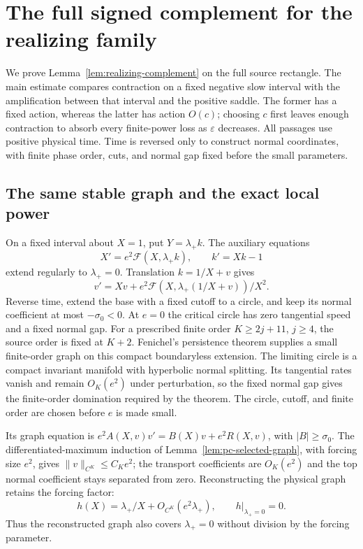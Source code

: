 \section{The full signed complement for the realizing family}
\label{sec:lower-complement}
We prove Lemma~\ref{lem:realizing-complement} on the full source
rectangle. The main estimate compares contraction on a fixed negative
slow interval with the amplification between that interval and the
positive saddle. The former has a fixed action, whereas the latter
has action $O(c)$; choosing $c$ first leaves enough contraction to
absorb every finite-power loss as $\varepsilon$ decreases. All
passages use positive physical time. Time is reversed only to
construct normal coordinates, with finite phase order, cuts, and
normal gap fixed before the small parameters.

\subsection{The same stable graph and the exact local power}
On a fixed interval about $X=1$, put $Y=\lambda_+k$. The auxiliary
equations
\[
 X'=e^2\mathcal F(X,\lambda_+k),\qquad k'=Xk-1
\]
extend regularly to $\lambda_+=0$. Translation $k=1/X+v$ gives
\[
 v'=Xv+e^2\mathcal F(X,\lambda_+(1/X+v))/X^2.
\]
Reverse time, extend the base with a fixed cutoff to a circle, and
keep its normal coefficient at most $-\sigma_0<0$. At $e=0$ the
critical circle has zero tangential speed and a fixed normal gap.
For a prescribed finite order $K\ge2j+11$, $j\ge4$, the source order
is fixed at $K+2$. Fenichel's persistence theorem
\cite[Theorem~3, p.~215]{Fenichel1971} supplies a small finite-order
graph on this compact boundaryless extension.
The limiting circle is a compact invariant manifold with hyperbolic
normal splitting. Its tangential rates vanish and remain $O_K(e^2)$
under perturbation, so the fixed normal gap gives the finite-order
domination required by the theorem. The circle, cutoff, and finite
order are chosen before $e$ is made small.

Its graph equation is
$e^2A(X,v)v'=B(X)v+e^2R(X,v)$, with $|B|\ge\sigma_0$.
The differentiated-maximum induction of
Lemma~\ref{lem:pc-selected-graph}, with forcing size $e^2$, gives
$\|v\|_{C^K}\le C_K e^2$; the transport coefficients are $O_K(e^2)$
and the top normal coefficient stays separated from zero.
Reconstructing the physical graph retains the forcing factor:
\begin{equation}\label{eq:realizing-stable-graph}
 h(X)=\lambda_+/X+O_{C^K}(e^2\lambda_+),\qquad
 h|_{\lambda_+=0}=0 .
\end{equation}
Thus the reconstructed graph also covers $\lambda_+=0$ without
division by the forcing parameter.

